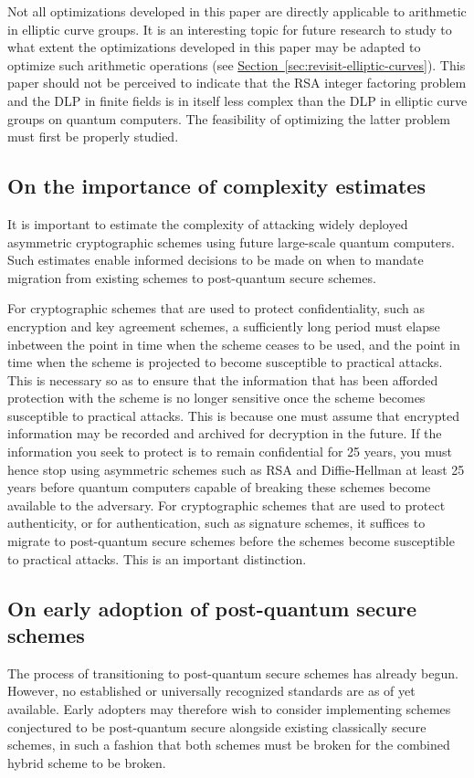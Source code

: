 \documentclass[superscriptaddress,notitlepage,longbibliography]{revtex4-1}
\theoremstyle{definition}
\theoremstyle{definition}
\renewcommand{\sec}[1]{\hyperref[sec:#1]{Section~\ref*{sec:#1}}}
\begin{document}
Not all optimizations developed in this paper are directly applicable to arithmetic in elliptic curve groups. It is an interesting topic for future research to study to what extent the optimizations developed in this paper may be adapted to optimize such arithmetic operations (see \sec{revisit-elliptic-curves}). This paper should not be perceived to indicate that the RSA integer factoring problem and the DLP in finite fields is in itself less complex than the DLP in elliptic curve groups on quantum computers. The feasibility of optimizing the latter problem must first be properly studied.

\subsection{On the importance of complexity estimates}
It is important to estimate the complexity of attacking widely deployed asymmetric cryptographic schemes using future large-scale quantum computers. Such estimates enable informed decisions to be made on when to mandate migration from existing schemes to post-quantum secure schemes.

For cryptographic schemes that are used to protect confidentiality, such as encryption and key agreement schemes, a sufficiently long period must elapse inbetween the point in time when the scheme ceases to be used, and the point in time when the scheme is projected to become susceptible to practical attacks. This is necessary so as to ensure that the information that has been afforded protection with the scheme is no longer sensitive once the scheme becomes susceptible to practical attacks. This is because one must assume that encrypted information may be recorded and archived for decryption in the future. If the information you seek to protect is to remain confidential for 25 years, you must hence stop using asymmetric schemes such as RSA and Diffie-Hellman at least 25 years before quantum computers capable of breaking these schemes become available to the adversary. For cryptographic schemes that are used to protect authenticity, or for authentication, such as signature schemes, it suffices to migrate to post-quantum secure schemes before the schemes become susceptible to practical attacks. This is an important distinction.

\subsection{On early adoption of post-quantum secure schemes}
The process of transitioning to post-quantum secure schemes has already begun.
However, no established or universally recognized standards are as of yet available.
Early adopters may therefore wish to consider implementing schemes conjectured to be post-quantum secure  alongside existing classically secure schemes, in such a fashion that both schemes must be broken for the combined hybrid scheme to be broken.
\end{document}
